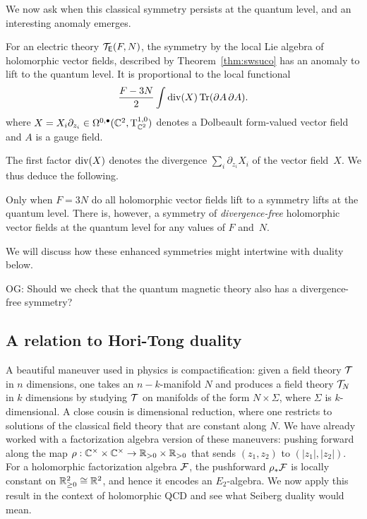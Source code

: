 \documentclass[11pt]{amsart}
\renewcommand{\op}{\operatorname}
\def\owen#1{{\textcolor{violet!65!black}{OG: {#1}}}}
\begin{document}
We now ask when this classical symmetry persists at the quantum level, and an interesting anomaly emerges.

\begin{prop}
For an electric theory $\mathcal T_{\mathsf E}(F,N)$,
the symmetry by the local Lie algebra of holomorphic vector fields, described by Theorem~\ref{thm:swsuco}
has an anomaly to lift to the quantum level. 
It is proportional to the local functional
\[
\frac{F - 3N}{2} \int {\rm div}(X) \op{Tr} (\partial A \, \partial A)  .
\]
where $X = X_i \partial_{z_i} \in \Omega^{0,\bullet}(\mathbb C^2, {\rm T}_{\mathbb C^2}^{1,0})$ denotes a Dolbeault form-valued vector field and $A$ is a gauge field.
\end{prop}

The first factor ${\rm div}(X)$ denotes the divergence $\sum_i\partial_{z_i} X_i$ of the vector field~$X$.
We thus deduce the following.

\begin{cor}
Only when $F = 3N$ do all holomorphic vector fields lift to a symmetry lifts at the quantum level.
There is, however, a symmetry of {\em divergence-free} holomorphic vector fields at the quantum level for any values of $F$ and~$N$.
\end{cor}

We will discuss how these enhanced symmetries might intertwine with duality below.

\owen{Should we check that the quantum magnetic theory also has a divergence-free symmetry?}

\subsection{A relation to Hori-Tong duality}

A beautiful maneuver used in physics is compactification:
given a field theory $\mathcal T$ in $n$ dimensions, one takes an $n-k$-manifold $N$ and produces a field theory $\mathcal T_N$ in $k$ dimensions by studying $\mathcal T$ on manifolds of the form $N \times \Sigma$, where $\Sigma$ is $k$-dimensional.
A close cousin is dimensional reduction, where one restricts to solutions of the classical field theory that are constant along $N$.
We have already worked with a factorization algebra version of these maneuvers: 
pushing forward along the map $\rho: \mathbb C^\times \times \mathbb C^\times \to \mathbb R_{>0} \times \mathbb R_{>0}$ that sends $(z_1,z_2)$ to $(|z_1|, |z_2|)$.
For a holomorphic factorization algebra $\mathcal F$, the pushforward $\rho_* \mathcal F$ is locally constant on $\mathbb R_{\geq 0}^2 \cong \mathbb R^2$, and hence it encodes an $E_2$-algebra.
We now apply this result in the context of holomorphic QCD and see what Seiberg duality would mean.
\end{document}

